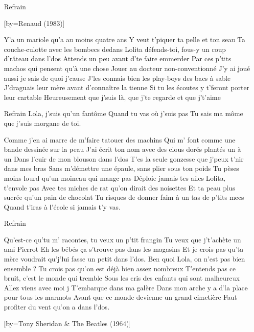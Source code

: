 \beginverse
Refrain
\endverse

[by={Renaud (1983)}]

\beginverse
Y'a un mariole qu'a au moins quatre ans
Y veut t'piquer ta pelle et ton seau
Ta couche-culotte avec les bombecs dedans
Lolita défends-toi, fous-y un coup d'râteau dans l'dos
Attends un peu avant d'te faire emmerder
Par ces p'tits machos qui pensent qu'à une chose
Jouer au docteur non-conventionné
J'y ai joué aussi je sais de quoi j'cause
J'les connais bien les play-boys des bacs à sable
J'draguais leur mère avant d'connaître la tienne
Si tu les écoutes y t'feront porter leur cartable
Heureusement que j'suis là, que j'te regarde et que j't'aime
\endverse

\beginverse
Refrain
Lola, j'suis qu'un fantôme
Quand tu vas où j'suis pas
Tu sais ma môme que j'suis morgane de toi.
\endverse

\beginverse
Comme j'en ai marre de m'faire tatouer des machins
Qui m' font comme une bande dessinée sur la peau
J'ai écrit ton nom avec des clous dorés plantés un à un
Dans l'cuir de mon blouson dans l'dos
T'es la seule gonzesse que j'peux t'nir dans mes bras
Sans m'démettre une épaule, sans plier sous ton poids
Tu pèses moins lourd qu'un moineau qui mange pas
Déploie jamais tes ailes Lolita, t'envole pas
Avec tes miches de rat qu'on dirait des noisettes
Et ta peau plus sucrée qu'un pain de chocolat
Tu risques de donner faim à un tas de p'tits mecs
Quand t'iras à l'école si jamais t'y vas.
\endverse

\beginverse
Refrain
\endverse

\beginverse
Qu'est-ce qu'tu m' racontes, tu veux un p'tit frangin
Tu veux que j't'achète un ami Pierrot
Eh les bébés ça s'trouve pas dans les magasins
Et je crois pas qu'ta mère voudrait qu'j'lui fasse un petit dans l'dos.
Ben quoi Lola, on n'est pas bien ensemble ?
Tu crois pas qu'on est déjà bien assez nombreux
T'entends pas ce bruit, c'est le monde qui tremble
Sous les cris des enfants qui sont malheureux
Allez viens avec moi j T'embarque dans ma galère
Dans mon arche y a d'la place pour tous les marmots
Avant que ce monde devienne un grand cimetière
Faut profiter du vent qu'on a dans l'dos.
\endverse

[by={Tony Sheridan & The Beatles (1964)}]


